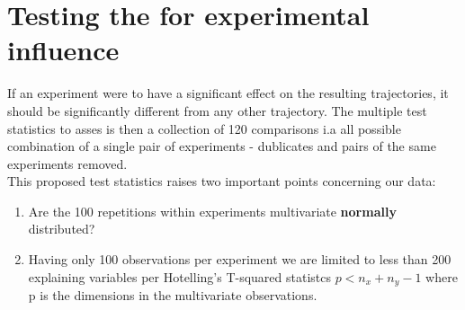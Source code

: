 \documentclass{article}
\begin{document}
\section{Testing the for experimental influence}
If an experiment were to have a significant effect on the resulting trajectories, it should be significantly different from any other trajectory. The multiple test statistics to asses is then a collection of 120 comparisons i.a all possible combination of a single pair of experiments - dublicates and pairs of the same experiments removed.\\ 
This proposed test statistics raises two important points concerning our data:
\begin{enumerate}
	\item  Are the 100 repetitions within experiments multivariate \textbf{normally} distributed?
	\item Having only 100 observations per experiment we are limited to less than 200 explaining variables per Hotelling's T-squared statistcs $p < n_x + n_y -1$ where p is the dimensions in the multivariate observations.
\end{enumerate}
\end{document}
